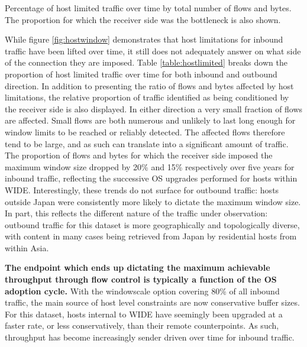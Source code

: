 \begin{table}\footnotesize
\centering
  \caption{\label{table:hostlimited}Percentage of host limited traffic over time by total number of flows and bytes. The proportion for which the receiver side was the bottleneck is also shown.}
\end{table}

While figure \ref{fig:hostwindow} demonstrates that host limitations for inbound traffic have been lifted over time, it still does not adequately answer on what side of the connection they are imposed.
Table \ref{table:hostlimited} breaks down the proportion of host limited traffic over time for both inbound and outbound direction.
In addition to presenting the ratio of flows and bytes affected by host limitations, the relative proportion of traffic identified as being conditioned by the receiver side is also displayed.
In either direction a very small fraction of flows are affected.
Small flows are both numerous and unlikely to last long enough for window limits to be reached or reliably detected.
The affected flows therefore tend to be large, and as such can translate into a significant amount of traffic.
The proportion of flows and bytes for which the receiver side imposed the maximum window size dropped by 20\% and 15\% respectively over five years for inbound traffic, reflecting the successive \acs{OS} upgrades performed for hosts within \ac{WIDE}.
Interestingly, these trends do not surface for outbound traffic: hosts outside Japan were consistently more likely to dictate the maximum window size.
In part, this reflects the different nature of the traffic under observation: outbound traffic for this dataset is more geographically and topologically diverse, with content in many cases being retrieved from Japan by residential hosts from within Asia.

\textbf{The endpoint which ends up dictating the maximum achievable throughput through flow control is typically a function of the \acs{OS} adoption cycle.}
With the windowscale option covering 80\% of all inbound traffic, the main source of host level constraints are now conservative buffer sizes.
For this dataset, hosts internal to \ac{WIDE} have seemingly been upgraded at a faster rate, or less conservatively, than their remote counterpoints.
As such, throughput has become increasingly sender driven over time for inbound traffic.

